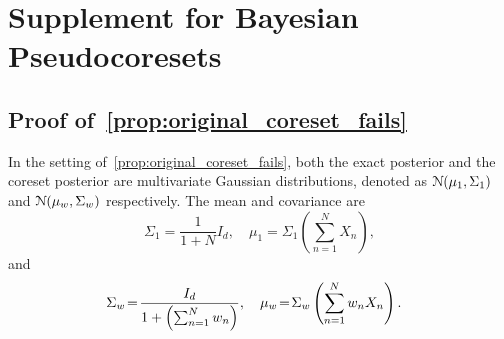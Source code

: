 \chapter{Supplement for Bayesian Pseudocoresets}
\label{app:app1}
\renewcommand*{\MyPath}{../Appendix1}%

\section{Proof of~\cref{prop:original_coreset_fails}}
\label{supp:proofs}

In the setting of~\cref{prop:original_coreset_fails}, both the exact posterior and the coreset posterior 
are multivariate Gaussian distributions, denoted as $\mathcal{N}{\left(\mu_1, \Sigma_1\right)}$ and 
$\mathcal{N}{\left(\mu_{w}, \Sigma_{w}\right)}$ respectively. 
The mean and covariance are
\[
\Sigma_{1}=\frac{1}{1+ N} I_d, \quad \mu_{1}=\Sigma_{1}\left( \sum_{n=1}^{N} X_{n}\right), 
\label{eq:exact_post}
\]
and
\[
\label{eq:coreset_post}
\hspace{-.3cm}\Sigma_{w}\!=\!\frac{I_d}{1+ \left(\sum_{n=1}^N w_n\right)}, 
\quad
\mu_{w}\!=\!\Sigma_{w}\left( \sum_{n=1}^{N} w_n X_{n}\right).
\]

